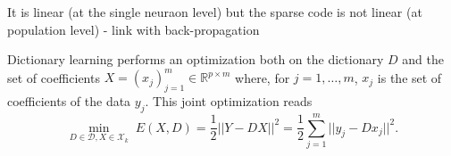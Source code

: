 \documentclass[a4paper, 11pt, draft]{article} %
\newcommand{\umin}[1]{\underset{#1}{\min}\;}
\newcommand{\enscond}[2]{\lbrace #1, #2 \rbrace}
\newcommand{\norm}[1]{|\!| #1 |\!|}
\newcommand{\Xx}{\mathcal{X}}
\newcommand{\RR}{\mathbb{R}}
\newcommand{\Dd}{\mathcal{D}}
\newcommand{\coef}{\mathbf{a}} %
\newcommand{\image}{\mathbf{I}} %
\newcommand{\dico}{\Phi} %
\begin{document}


It is linear (at the single neuraon level) but the sparse code is not linear (at population level) - link with back-propagation


Dictionary learning performs an optimization both on the dictionary $D$
and the set of coefficients $ X = (x_j)_{j=1}^m \in \RR^{p \times m} $
where, for $j=1,\ldots,m$, $ x_j $
is the set of coefficients of the data $y_j$. This joint optimization reads
$$ \umin{ D \in \Dd, X \in \Xx_k } E(X,D) = \frac{1}{2}\norm{Y-DX}^2 =
\frac{1}{2} \sum_{j=1}^m \norm{y_j - D x_j}^2. $$


%
%
%
%
%
%
%
%
%
%


%
%
%
%
\end{document}

